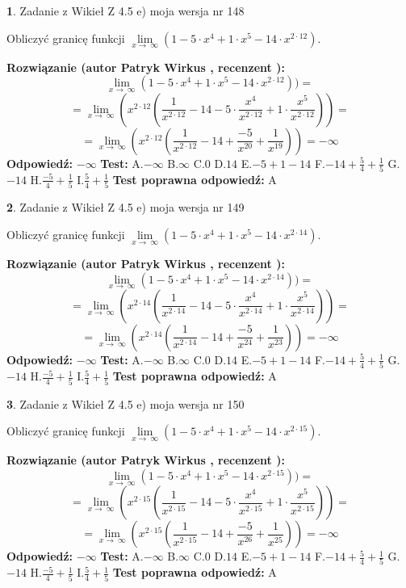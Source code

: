 \documentclass[12pt, a4paper]{article}
\theoremstyle{definition} %
\newtheorem{zad}{}
\newcommand{\zadStart}[1]{\begin{zad}#1\newline}
\newcommand{\zadStop}{\end{zad}}
\newcommand{\rozwStart}[2]{\noindent \textbf{Rozwiązanie (autor #1 , recenzent #2): }\newline}
\newcommand{\rozwStop}{\newline}
\newcommand{\odpStart}{\noindent \textbf{Odpowiedź:}\newline}
\newcommand{\odpStop}{\newline}
\newcommand{\testStart}{\noindent \textbf{Test:}\newline}
\newcommand{\testStop}{\newline}
\newcommand{\kluczStart}{\noindent \textbf{Test poprawna odpowiedź:}\newline}
\newcommand{\kluczStop}{\newline}
\begin{document}
\zadStart{Zadanie z Wikieł Z 4.5 e) moja wersja nr 148}



Obliczyć granicę funkcji  $\lim\limits_{x\to\ \infty}(1 - 5 \cdot x^{4}+1 \cdot x^{5}- 14 \cdot x^{2\cdot12})$.
\zadStop
\rozwStart{Patryk Wirkus}{}
$$\lim\limits_{x\to\ \infty}(1 - 5 \cdot x^{4}+1 \cdot x^{5}- 14 \cdot x^{2\cdot12}))=$$
$$=\lim\limits_{x\to\ \infty}(x^{2\cdot12}(\frac{1}{x^{2\cdot12}}-14 -5 \cdot \frac{x^{4}}{x^{2\cdot12}}+1 \cdot \frac{x^{5}}{x^{2\cdot12}}))=$$
$$=\lim\limits_{x\to\ \infty}(x^{2\cdot12}(\frac{1}{x^{2\cdot12}}-14 + \frac{-5}{x^{20}}+ \frac{1}{x^{19}}))=-\infty$$
\rozwStop
\odpStart
$-\infty$
\odpStop
\testStart
A.$-\infty$ B.$\infty$ C.$0$ D.$14$ E.$-5 + 1 - 14$
F.$-14+\frac{5}{4}+\frac{1}{5}$ G.$-14$
H.$\frac{-5}{4}+\frac{1}{5}$
I.$\frac{5}{4}+\frac{1}{5}$
\testStop
\kluczStart
A
\kluczStop



\zadStart{Zadanie z Wikieł Z 4.5 e) moja wersja nr 149}



Obliczyć granicę funkcji  $\lim\limits_{x\to\ \infty}(1 - 5 \cdot x^{4}+1 \cdot x^{5}- 14 \cdot x^{2\cdot14})$.
\zadStop
\rozwStart{Patryk Wirkus}{}
$$\lim\limits_{x\to\ \infty}(1 - 5 \cdot x^{4}+1 \cdot x^{5}- 14 \cdot x^{2\cdot14}))=$$
$$=\lim\limits_{x\to\ \infty}(x^{2\cdot14}(\frac{1}{x^{2\cdot14}}-14 -5 \cdot \frac{x^{4}}{x^{2\cdot14}}+1 \cdot \frac{x^{5}}{x^{2\cdot14}}))=$$
$$=\lim\limits_{x\to\ \infty}(x^{2\cdot14}(\frac{1}{x^{2\cdot14}}-14 + \frac{-5}{x^{24}}+ \frac{1}{x^{23}}))=-\infty$$
\rozwStop
\odpStart
$-\infty$
\odpStop
\testStart
A.$-\infty$ B.$\infty$ C.$0$ D.$14$ E.$-5 + 1 - 14$
F.$-14+\frac{5}{4}+\frac{1}{5}$ G.$-14$
H.$\frac{-5}{4}+\frac{1}{5}$
I.$\frac{5}{4}+\frac{1}{5}$
\testStop
\kluczStart
A
\kluczStop



\zadStart{Zadanie z Wikieł Z 4.5 e) moja wersja nr 150}



Obliczyć granicę funkcji  $\lim\limits_{x\to\ \infty}(1 - 5 \cdot x^{4}+1 \cdot x^{5}- 14 \cdot x^{2\cdot15})$.
\zadStop
\rozwStart{Patryk Wirkus}{}
$$\lim\limits_{x\to\ \infty}(1 - 5 \cdot x^{4}+1 \cdot x^{5}- 14 \cdot x^{2\cdot15}))=$$
$$=\lim\limits_{x\to\ \infty}(x^{2\cdot15}(\frac{1}{x^{2\cdot15}}-14 -5 \cdot \frac{x^{4}}{x^{2\cdot15}}+1 \cdot \frac{x^{5}}{x^{2\cdot15}}))=$$
$$=\lim\limits_{x\to\ \infty}(x^{2\cdot15}(\frac{1}{x^{2\cdot15}}-14 + \frac{-5}{x^{26}}+ \frac{1}{x^{25}}))=-\infty$$
\rozwStop
\odpStart
$-\infty$
\odpStop
\testStart
A.$-\infty$ B.$\infty$ C.$0$ D.$14$ E.$-5 + 1 - 14$
F.$-14+\frac{5}{4}+\frac{1}{5}$ G.$-14$
H.$\frac{-5}{4}+\frac{1}{5}$
I.$\frac{5}{4}+\frac{1}{5}$
\testStop
\kluczStart
A
\kluczStop
\end{document}
